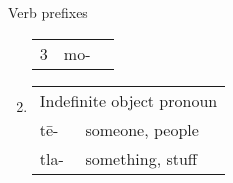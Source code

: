 \documentclass[12pt]{beamer}
\newcommand{\nah}[1]{\textcolor{nahgrn}{#1}}
\newcommand{\trs}[1]{\textcolor{nahblu}{#1}}
\begin{document}
\begin{frame}
\begin{columns}[t]
\begin{column}{0.18\linewidth}
\begin{block}{Verb prefixes}
\begin{enumerate}
\begin{tabular}[t]{llll}
                  3 & \multicolumn{2}{c}{\nah{mo-}}                                                                  \\
                \end{tabular}
          \item
                \begin{tabular}[t]{ll}
                  \multicolumn{2}{l}{Indefinite object pronoun} \\
                  \nah{tē-}  & \trs{someone, people}            \\
                  \nah{tla-} & \trs{something, stuff}           \\
                \end{tabular}
        \end{enumerate}
      \end{block}


\end{column}
\end{columns}
\end{frame}
\end{document}
